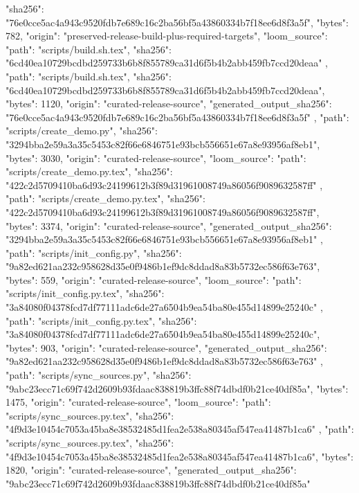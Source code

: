 {{      "sha256": "76e0cce5ac4a943c9520fdb7e689c16c2ba56bf5a43860334b7f18ee6d8f3a5f",
      "bytes": 782,
      "origin": "preserved-release-build-plus-required-targets",
      "loom_source": {
        "path": "scripts/build.sh.tex",
        "sha256": "6cd40ea10729bcdbd259733b6b8f855789ca31d6f5b4b2abb459fb7ccd20deaa"
      }
    },
    {
      "path": "scripts/build.sh.tex",
      "sha256": "6cd40ea10729bcdbd259733b6b8f855789ca31d6f5b4b2abb459fb7ccd20deaa",
      "bytes": 1120,
      "origin": "curated-release-source",
      "generated_output_sha256": "76e0cce5ac4a943c9520fdb7e689c16c2ba56bf5a43860334b7f18ee6d8f3a5f"
    },
    {
      "path": "scripts/create_demo.py",
      "sha256": "3294bba2e59a3a35c5453c82f66e6846751e93bcb556651e67a8e93956af8eb1",
      "bytes": 3030,
      "origin": "curated-release-source",
      "loom_source": {
        "path": "scripts/create_demo.py.tex",
        "sha256": "422c2d5709410ba6d93c24199612b3f89d31961008749a86056f9089632587ff"
      }
    },
    {
      "path": "scripts/create_demo.py.tex",
      "sha256": "422c2d5709410ba6d93c24199612b3f89d31961008749a86056f9089632587ff",
      "bytes": 3374,
      "origin": "curated-release-source",
      "generated_output_sha256": "3294bba2e59a3a35c5453c82f66e6846751e93bcb556651e67a8e93956af8eb1"
    },
    {
      "path": "scripts/init_config.py",
      "sha256": "9a82ed621aa232c958628d35e0f9486b1ef9dc8ddad8a83b5732ec586f63e763",
      "bytes": 559,
      "origin": "curated-release-source",
      "loom_source": {
        "path": "scripts/init_config.py.tex",
        "sha256": "3a84080f04378fcd7df77111adc6de27a6504b9ea54ba80e455d14899e25240c"
      }
    },
    {
      "path": "scripts/init_config.py.tex",
      "sha256": "3a84080f04378fcd7df77111adc6de27a6504b9ea54ba80e455d14899e25240c",
      "bytes": 903,
      "origin": "curated-release-source",
      "generated_output_sha256": "9a82ed621aa232c958628d35e0f9486b1ef9dc8ddad8a83b5732ec586f63e763"
    },
    {
      "path": "scripts/sync_sources.py",
      "sha256": "9abc23ecc71c69f742d2609b93fdaac838819b3ffc88f74dbdf0b21ce40df85a",
      "bytes": 1475,
      "origin": "curated-release-source",
      "loom_source": {
        "path": "scripts/sync_sources.py.tex",
        "sha256": "4f9d3e10454c7053a45ba8e38532485d1fea2e538a80345af547ea41487b1ca6"
      }
    },
    {
      "path": "scripts/sync_sources.py.tex",
      "sha256": "4f9d3e10454c7053a45ba8e38532485d1fea2e538a80345af547ea41487b1ca6",
      "bytes": 1820,
      "origin": "curated-release-source",
      "generated_output_sha256": "9abc23ecc71c69f742d2609b93fdaac838819b3ffc88f74dbdf0b21ce40df85a"
}}
